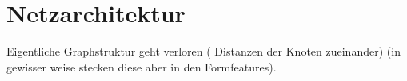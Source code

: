 \section{Netzarchitektur}
\label{raeumliche_netzarchitektur}




Eigentliche Graphstruktur geht verloren (\zB{} Distanzen der Knoten zueinander) (in gewisser weise stecken diese aber in den Formfeatures).
